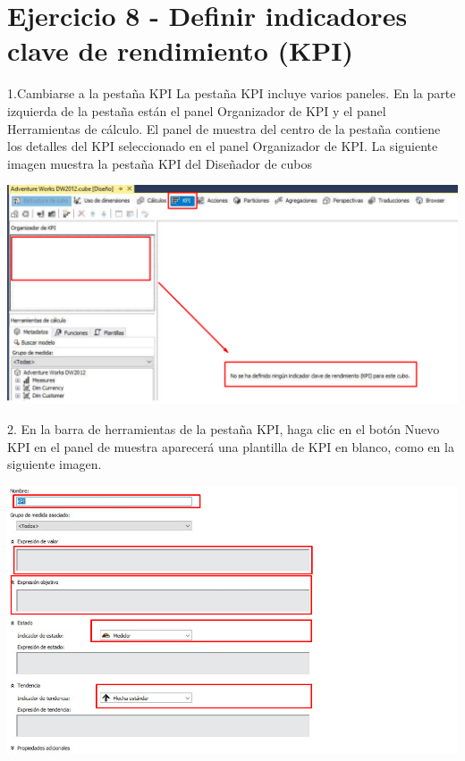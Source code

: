 \section{Ejercicio 8 - Definir indicadores clave de rendimiento (KPI)}  

1.Cambiarse a la pestaña KPI La pestaña KPI incluye varios paneles. En la parte izquierda de la pestaña están el panel Organizador de KPI y el panel Herramientas de cálculo. El panel de muestra del centro de la pestaña contiene los detalles del KPI seleccionado en el panel Organizador de KPI. La siguiente imagen muestra la pestaña KPI del Diseñador de cubos

	\begin{center}
	\includegraphics[width=\columnwidth]{images/task8/img1}
	\end{center}	

2. En la barra de herramientas de la pestaña KPI, haga clic en el botón Nuevo KPI en el panel de muestra aparecerá una plantilla de KPI en blanco, como en la siguiente imagen.

	\begin{center}
	\includegraphics[width=\columnwidth]{images/task8/img2}
	\end{center}	

